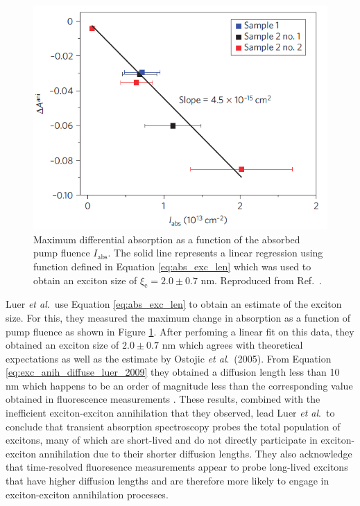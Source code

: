 \begin{figure}[ht]
	\centering
	\includegraphics[scale=0.8]{images/chapter_prior_works/exciton_size_fit_luer_2009}
	\caption{Maximum differential absorption as a function of the absorbed pump fluence $I_\text{abs}$. The solid line represents a linear regression using function defined in Equation \eqref{eq:abs_exc_len} which was used to obtain an exciton size of $\xi_\text{e} = 2.0 \pm 0.7$ nm. Reproduced from Ref.\ \cite{luer2009size}.}
	\label{fig:lin_fit_luer_2009}
\end{figure}

Luer \textit{et al}.\ use Equation \eqref{eq:abs_exc_len} to obtain an estimate of the exciton size. For this, they measured the maximum change in absorption as a function of pump fluence as shown in Figure \ref{fig:lin_fit_luer_2009}. After perfoming a linear fit on this data, they obtained an exciton size of $2.0 \pm 0.7$ nm which agrees with theoretical expectations \cite{spataru2004excitonic, chang2004excitons, tretiak2007excitons} as well as the estimate by Ostojic \textit{et al}.\ (2005). From Equation \eqref{eq:exc_anih_diffuse_luer_2009} they obtained a diffusion length less than 10 nm which happens to be an order of magnitude less than the corresponding value obtained in fluorescence measurements \cite{cognet2007stepwise}. These results, combined with the inefficient exciton-exciton annihilation that they observed, lead Luer \textit{et al}.\ to conclude that transient absorption spectroscopy probes the total population of excitons, many of which are short-lived and do not directly participate in exciton-exciton annihilation due to their shorter diffusion lengths. They also acknowledge that time-resolved fluoresence measurements appear to probe long-lived excitons that have higher diffusion lengths and are therefore more likely to engage in exciton-exciton annihilation processes.

